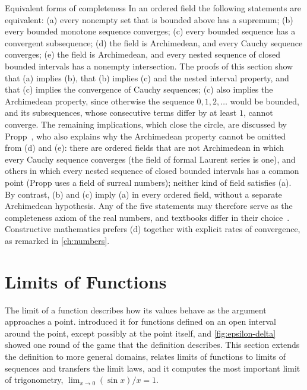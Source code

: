 \begin{note}{Equivalent forms of completeness}
In an ordered field the following statements are equivalent: (a) every nonempty set that is bounded above has a supremum; (b) every bounded monotone sequence converges; (c) every bounded sequence has a convergent subsequence; (d) the field is Archimedean, and every Cauchy sequence converges; (e) the field is Archimedean, and every nested sequence of closed bounded intervals has a nonempty intersection. The proofs of this section show that (a) implies (b), that (b) implies (c) and the nested interval property, and that (c) implies the convergence of Cauchy sequences; (c) also implies the Archimedean property, since otherwise the sequence $0,1,2,\ldots$ would be bounded, and its subsequences, whose consecutive terms differ by at least $1$, cannot converge. The remaining implications, which close the circle, are discussed by Propp~\cite{propp2013}, who also explains why the Archimedean property cannot be omitted from (d) and (e): there are ordered fields that are not Archimedean in which every Cauchy sequence converges (the field of formal Laurent series is one), and others in which every nested sequence of closed bounded intervals has a common point (Propp uses a field of surreal numbers); neither kind of field satisfies (a). By contrast, (b) and (c) imply (a) in every ordered field, without a separate Archimedean hypothesis. Any of the five statements may therefore serve as the completeness axiom of the real numbers, and textbooks differ in their choice~\cite{bartle2011,abbott2015}. Constructive mathematics prefers (d) together with explicit rates of convergence, as remarked in \cref{ch:numbers}.
\end{note}

\section{Limits of Functions}
\label{sec:function-limits}

The limit of a function describes how its values behave as the argument approaches a point.  introduced it for functions defined on an open interval around the point, except possibly at the point itself, and \cref{fig:epsilon-delta} showed one round of the game that the definition describes. This section extends the definition to more general domains, relates limits of functions to limits of sequences and transfers the limit laws, and it computes the most important limit of trigonometry, $\lim_{x\to0}(\sin x)/x=1$.

